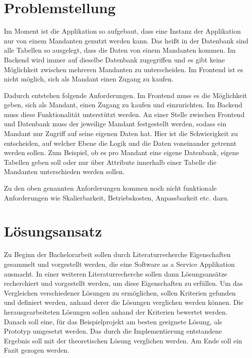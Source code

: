 \section{Problemstellung}\label{sec:problemstellung}

Im Moment ist die Applikation so aufgebaut, dass eine Instanz der Applikation nur von einem Mandanten genutzt werden kann.
Das heißt in der Datenbank sind alle Tabellen so ausgelegt, dass die Daten von einem Mandanten kommen.
Im Backend wird immer auf dieselbe Datenbank zugegriffen und es gibt keine Möglichkeit zwischen mehreren Mandanten zu unterscheiden.
Im Frontend ist es nicht möglich, sich als Mandant einen Zugang zu kaufen.

Dadurch entstehen folgende Anforderungen.
Im Frontend muss es die Möglichkeit geben, sich als Mandant, einen Zugang zu kaufen und einzurichten.
Im Backend muss diese Funktionalität unterstützt werden.
An einer Stelle zwischen Frontend und Datenbank muss der jeweilige Mandant festgestellt werden, sodass ein Mandant nur Zugriff auf seine eigenen Daten hat.
Hier ist die Schwierigkeit zu entscheiden, auf welcher Ebene die Logik und die Daten voneinander getrennt werden sollen.
Zum Beispiel, ob es pro Mandant eine eigene Datenbank, eigene Tabellen geben soll oder nur über Attribute innerhalb einer Tabelle die Mandanten unterschieden werden sollen.

Zu den oben genannten Anforderungen kommen noch nicht funktionale Anforderungen wie Skalierbarkeit, Betriebskosten, Anpassbarkeit etc. dazu.

\section{Lösungsansatz}\label{sec:loesungsansatz}

Zu Beginn der Bachelorarbeit sollen durch Literaturrecherche Eigenschaften gesammelt und vorgestellt werden, die eine Software as a Service Applikation ausmacht.
In einer weiteren Literaturrecherche sollen dann Lösungsansätze recherchiert und vorgestellt werden, um diese Eigenschaften zu erfüllen.
Um das Vergleichen verschiedener Lösungen zu ermöglichen, sollen Kriterien gefunden und definiert werden, anhand derer die Lösungen verglichen werden können.
Die herausgearbeiteten Lösungen sollen anhand der Kriterien bewertet werden.
Danach soll eine, für das Beispielprojekt am besten geeignete Lösung, als Prototyp umgesetzt werden.
Das durch die Implementierung entstandene Ergebnis soll mit der theoretischen Lösung verglichen werden.
Am Ende soll ein Fazit gezogen werden.

